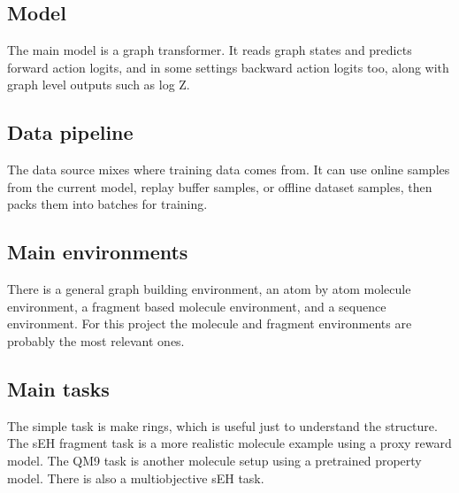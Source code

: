 \documentclass{article}
\begin{document}
\subsection{Model}
The main model is a graph transformer. It reads graph states and predicts forward action logits, and in some settings backward action logits too, along with graph level outputs such as log Z.

\subsection{Data pipeline}
The data source mixes where training data comes from. It can use online samples from the current model, replay buffer samples, or offline dataset samples, then packs them into batches for training.

\subsection{Main environments}
There is a general graph building environment, an atom by atom molecule environment, a fragment based molecule environment, and a sequence environment. For this project the molecule and fragment environments are probably the most relevant ones.

\subsection{Main tasks}
The simple task is make rings, which is useful just to understand the structure. The sEH fragment task is a more realistic molecule example using a proxy reward model. The QM9 task is another molecule setup using a pretrained property model. There is also a multiobjective sEH task.


\end{document}
